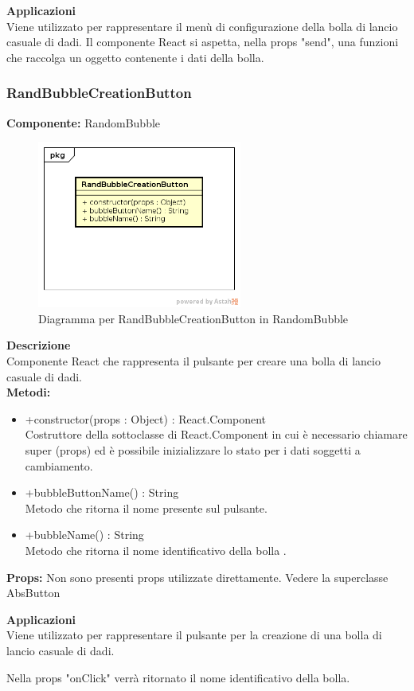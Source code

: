 \textbf{Applicazioni}\\
Viene utilizzato per rappresentare il menù di configurazione della bolla di lancio casuale di dadi. Il componente React si aspetta, nella props "send", una funzioni che raccolga un oggetto contenente i dati della bolla. 


\clearpage

\subsubsection{RandBubbleCreationButton}
\textbf{Componente:}  RandomBubble\\
   \FloatBarrier
   \begin{figure}[ht]
   \centering
   \includegraphics[width=0.6\textwidth]{img/single-RandBubbleCreationButton.png}
   \caption{{Diagramma per RandBubbleCreationButton in RandomBubble}}
\end{figure}
\FloatBarrier
\textbf{Descrizione}\\
Componente React che rappresenta il pulsante per creare una bolla di lancio casuale di dadi.
\\
\textbf{Metodi:} 
\begin{itemize}
\item +constructor(props : Object) : React.Component 
\\
Costruttore della sottoclasse di React.Component in cui è necessario chiamare super (props) ed è possibile inizializzare lo stato per i dati soggetti a cambiamento.

\item +bubbleButtonName() : String 
\\
Metodo che ritorna il nome presente sul pulsante.

\item +bubbleName() : String 
\\
Metodo che ritorna il nome identificativo della bolla .

\end{itemize}

\textbf{Props:} 
Non sono presenti props utilizzate direttamente. Vedere la superclasse AbsButton 


\textbf{Applicazioni}\\
Viene utilizzato per rappresentare il pulsante per la creazione di una bolla di lancio casuale di dadi.

Nella props "onClick" verrà ritornato il nome identificativo della bolla. 


